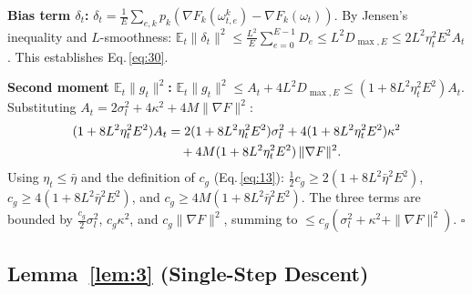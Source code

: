 \documentclass[journal]{IEEEtran}
\begin{document}
\noindent\textbf{Bias term \(\delta_t\):}
\(\delta_t = \frac{1}{E}\sum_{e,k} p_k(\nabla F_k(\omega_{t,e}^k) - \nabla F_k(\omega_t))\).
By Jensen's inequality and \(L\)-smoothness:
\(\mathbb E_t\|\delta_t\|^2 \le \frac{L^2}{E}\sum_{e=0}^{E-1} D_e
 \le L^2 D_{\max,E} \le 2L^2\eta_t^2 E^2 A_t\).\;
This establishes Eq.\,\eqref{eq:30}.

\noindent\textbf{Second moment \(\mathbb E_t\|g_t\|^2\):}
\(\mathbb E_t\|g_t\|^2 \le A_t + 4L^2 D_{\max,E} \le (1+8L^2\eta_t^2 E^2)A_t\).
Substituting \(A_t = 2\sigma_l^2 + 4\kappa^2 + 4M\|\nabla F\|^2\):
\begin{align*}
  (1+8L^2\eta_t^2 E^2)A_t
  &= 2(1+8L^2\eta_t^2 E^2)\sigma_l^2
     + 4(1+8L^2\eta_t^2 E^2)\kappa^2 \notag\\
  &\quad + 4M(1+8L^2\eta_t^2 E^2)\,\|\nabla F\|^2.
\end{align*}
Using \(\eta_t \le \bar\eta\) and the definition of \(c_g\) (Eq.\,\eqref{eq:13}):
\(\frac{1}{2}c_g \ge 2(1+8L^2\bar\eta^2 E^2)\),
\(c_g \ge 4(1+8L^2\bar\eta^2 E^2)\), and
\(c_g \ge 4M(1+8L^2\bar\eta^2 E^2)\).
The three terms are bounded by \(\frac{c_g}{2}\sigma_l^2\), \(c_g\kappa^2\), and \(c_g\|\nabla F\|^2\),
summing to \(\le c_g(\sigma_l^2 + \kappa^2 + \|\nabla F\|^2)\). \(\square\)

\subsection*{Lemma~\ref{lem:3} (Single-Step Descent)}
\end{document}
